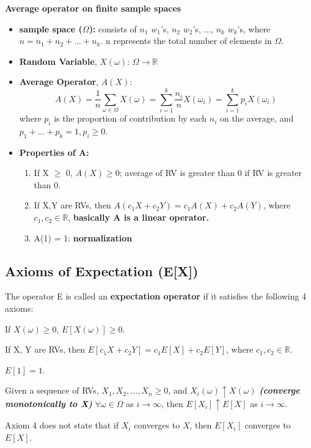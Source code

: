 \begin{exmp}\textbf{Average operator on finite sample spaces}
    \begin{itemize}
        \item \textbf{sample space ($\Omega$):} consists of $n_1$ $w_1$'s, $n_2$ $w_2$'s, ..., $n_k$ $w_k$'s, where $n = n_1 + n_2 + ... + n_k$. n represents the total number of elements in $\Omega$.
        \item \textbf{Random Variable}, $X(\omega)$: $\Omega \rightarrow \mathbb{R}$
        \item \textbf{Average Operator}, $A(X)$:
        \begin{equation*}
            A(X) = \frac{1}{n}\sum_{\omega \in \Omega}X(\omega) = \sum_{i=1}^k\frac{n_i}{n}X(\omega_i) = \sum_{i=1}^kp_iX(\omega_i)  
        \end{equation*}
        where $p_i$ is the proportion of contribution by each $n_i$ on the average, and $p_1 + ... + p_k = 1, p_i \geq 0$.
        \item \textbf{Properties of A:}
        \begin{enumerate}
            \item If X $\geq$ 0, $A(X) \geq 0$; average of RV is greater than 0 if RV is greater than 0.
            \item If X,Y are RVs, then $A(c_1X + c_2Y) = c_1A(X) + c_2A(Y)$, where $c_1, c_2 \in \mathbb{R}$, \textbf{basically A is a linear operator.}
            \item A(1) = 1: \textbf{normalization}
        \end{enumerate}
    \end{itemize}
\end{exmp} 

\subsection{Axioms of Expectation (E[X])}

The operator E is called an \textbf{expectation operator} if it satisfies the following 4 axioms:
\begin{axiom}
    If $X(\omega) \geq 0$, $E[X(\omega)] \geq 0$.
\end{axiom}
\begin{axiom}
    If X, Y are RVs, then $E[c_1X + c_2Y] = c_1E[X] + c_2E[Y]$, where $c_1, c_2 \in \mathbb{R}$.
\end{axiom}
\begin{axiom}
    $E[1] = 1$.
\end{axiom}
\begin{axiom}
    Given a sequence of RVs, $X_1, X_2, ..., X_n \geq 0$, and $X_i(\omega) \uparrow X(\omega)$ \textbf{\textit{(converge monotonically to X)}} $ \forall \omega \in \Omega$ as $i \rightarrow \infty$, then $E[X_i] \uparrow E[X]$ as $i\rightarrow\infty$.
\end{axiom}
\begin{rem}
    Axiom 4 does not state that if $X_i$ converges to $X$, then $E[X_i]$ converges to $E[X]$.
\end{rem} 

